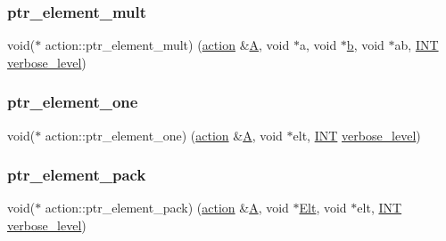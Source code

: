 \subsubsection{\texorpdfstring{ptr\+\_\+element\+\_\+mult}{ptr\_element\_mult}}
{\footnotesize\ttfamily void($\ast$ action\+::ptr\+\_\+element\+\_\+mult) (\mbox{\hyperlink{classaction}{action}} \&\mbox{\hyperlink{simeon_8_c_a97833f04c3a9c008df5521a2fc291bb4}{A}}, void $\ast$a, void $\ast$\mbox{\hyperlink{alphabet2_8_c_a148e3876077787926724625411d6e7a9}{b}}, void $\ast$ab, \mbox{\hyperlink{galois_8h_a09fddde158a3a20bd2dcadb609de11dc}{I\+NT}} \mbox{\hyperlink{simeon_8_c_a818073fbcc2f439e7c56952f67386122}{verbose\+\_\+level}})}

\mbox{\label{classaction_ad658687eb4f908362e1ec72ce9618ed3}} 
\subsubsection{\texorpdfstring{ptr\+\_\+element\+\_\+one}{ptr\_element\_one}}
{\footnotesize\ttfamily void($\ast$ action\+::ptr\+\_\+element\+\_\+one) (\mbox{\hyperlink{classaction}{action}} \&\mbox{\hyperlink{simeon_8_c_a97833f04c3a9c008df5521a2fc291bb4}{A}}, void $\ast$elt, \mbox{\hyperlink{galois_8h_a09fddde158a3a20bd2dcadb609de11dc}{I\+NT}} \mbox{\hyperlink{simeon_8_c_a818073fbcc2f439e7c56952f67386122}{verbose\+\_\+level}})}

\mbox{\label{classaction_a0e6b1c0f53ec66cf13aceb47085741bb}} 
\subsubsection{\texorpdfstring{ptr\+\_\+element\+\_\+pack}{ptr\_element\_pack}}
{\footnotesize\ttfamily void($\ast$ action\+::ptr\+\_\+element\+\_\+pack) (\mbox{\hyperlink{classaction}{action}} \&\mbox{\hyperlink{simeon_8_c_a97833f04c3a9c008df5521a2fc291bb4}{A}}, void $\ast$\mbox{\hyperlink{simeon_8_c_aec1406935bdb1fee3561fcb840964100}{Elt}}, void $\ast$elt, \mbox{\hyperlink{galois_8h_a09fddde158a3a20bd2dcadb609de11dc}{I\+NT}} \mbox{\hyperlink{simeon_8_c_a818073fbcc2f439e7c56952f67386122}{verbose\+\_\+level}})}

